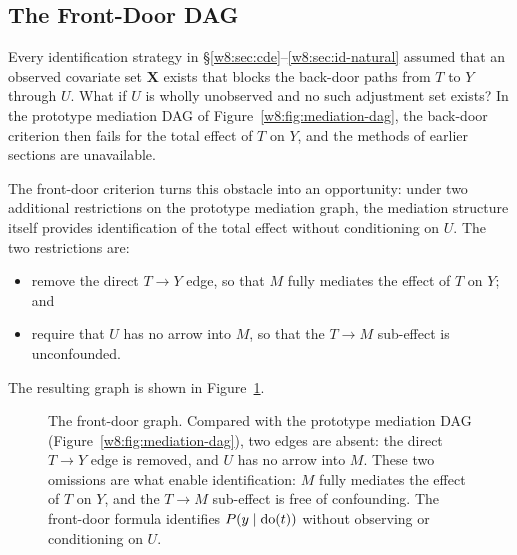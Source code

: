 \documentclass[master.tex]{subfiles}
\begin{document}
\subsection{The Front-Door DAG}

Every identification strategy in
§\ref{w8:sec:cde}--\ref{w8:sec:id-natural} assumed that an observed
covariate set $\mathbf{X}$ exists that blocks the back-door paths from
$T$ to $Y$ through $U$.  What if $U$ is wholly unobserved and no such
adjustment set exists?  In the prototype mediation DAG of
Figure~\ref{w8:fig:mediation-dag}, the back-door criterion then fails
for the total effect of $T$ on $Y$, and the methods of earlier sections
are unavailable.

The front-door criterion turns this obstacle into an opportunity: under
two additional restrictions on the prototype mediation graph, the
mediation structure itself provides identification of the total effect
without conditioning on $U$.  The two restrictions are:
\begin{itemize}
  \item remove the direct $T \to Y$ edge, so that $M$ fully mediates
    the effect of $T$ on $Y$; and
  \item require that $U$ has no arrow into $M$, so that the $T \to M$
    sub-effect is unconfounded.
\end{itemize}
The resulting graph is shown in Figure~\ref{w8:fig:frontdoor}.

\begin{figure}[h]
\centering
{}
\caption{The front-door graph.  Compared with the prototype mediation
DAG (Figure~\ref{w8:fig:mediation-dag}), two edges are absent: the
direct $T \to Y$ edge is removed, and $U$ has no arrow into $M$.  These
two omissions are what enable identification: $M$ fully mediates the
effect of $T$ on $Y$, and the $T \to M$ sub-effect is free of
confounding.  The front-door formula identifies $P(y \mid \mathrm{do}(t))$
without observing or conditioning on $U$.}
\label{w8:fig:frontdoor}
\end{figure}
\end{document}
